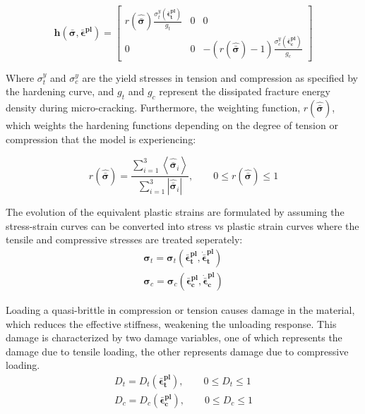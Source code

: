 \begin{equation}
\mathbf{h}\left(\boldsymbol{\bar{\sigma}},\boldsymbol{\bar{\epsilon}^{pl}}\right)=\left[\begin{array}{ccc}
r\left(\boldsymbol{\hat{\bar{\sigma}}}\right)\frac{\sigma^y_t\left(\boldsymbol{\bar{\epsilon}_{t}^{pl}}\right)}{g_t} & 0 & 0\\
0 & 0 & -\left(r\left(\boldsymbol{\hat{\bar{\sigma}}}\right)-1\right)\frac{\sigma^y_c\left(\boldsymbol{\bar{\epsilon}_{c}^{pl}}\right)}{g_c}
\end{array}\right]\label{eqn:const9-1}
\end{equation}

Where $\sigma^y_t$ and $\sigma^y_c$ are the yield stresses in tension and compression as specified by the hardening curve, and $g_t$ and $g_c$ represent the dissipated fracture energy density during micro-cracking. Furthermore, the weighting function, $r\left(\hat{\boldsymbol{\bar{\sigma}}}\right)$, which weights the hardening functions depending on the degree of tension or compression that the model is experiencing:

\begin{equation}
r\left(\hat{\boldsymbol{\bar{\sigma}}}\right)=\frac{\sum_{i=1}^{3}\left\langle \hat{\boldsymbol{\bar{\sigma}}}_{i}\right\rangle }{\sum_{i=1}^{3}\left|\hat{\boldsymbol{\bar{\sigma}}}_{i}\right|},\qquad0\leq r\left(\hat{\boldsymbol{\bar{\sigma}}}\right)\leq1\label{eqn:const9-2}
\end{equation}

The evolution of the equivalent plastic strains are formulated by
assuming the stress-strain curves can be converted into stress vs
plastic strain curves where the tensile and compressive stresses are
treated seperately: 
\begin{equation}
\begin{array}{c}
\boldsymbol{\sigma}_{t}=\boldsymbol{\sigma}_{t}\left(\boldsymbol{\bar{\epsilon}_{t}^{pl}},\boldsymbol{\dot{\bar{\epsilon}}_{t}^{pl}}\right)\\
\boldsymbol{\sigma}_{c}=\boldsymbol{\sigma}_{c}\left(\boldsymbol{\bar{\epsilon}_{c}^{pl}},\boldsymbol{\dot{\bar{\epsilon}}_{c}^{pl}}\right)
\end{array}
\label{eqn:dam1}
\end{equation}


Loading a quasi-brittle in compression or tension causes damage in
the material, which reduces the effective stiffness, weakening the
unloading response. This damage is characterized by two damage variables,
one of which represents the damage due to tensile loading, the other
represents damage due to compressive loading. 
\begin{equation}
\begin{array}{c}
D_{t}=D_{t}\left(\boldsymbol{\bar{\epsilon}_{t}^{pl}}\right),\qquad0\leq D_{t}\leq1\\
D_{c}=D_{c}\left(\boldsymbol{\bar{\epsilon}_{c}^{pl}}\right),\qquad0\leq D_{c}\leq1\end{array}
\label{eqn:dam2}
\end{equation}


